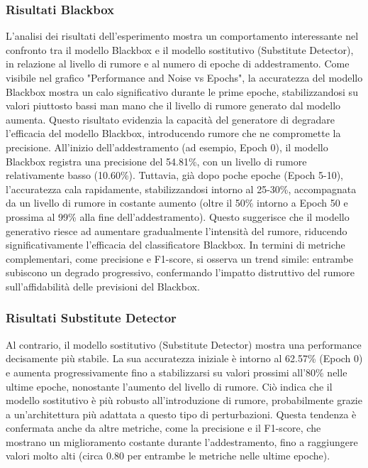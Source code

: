 \subsubsection{Risultati Blackbox}
L'analisi dei risultati dell'esperimento mostra un comportamento interessante nel confronto tra il modello Blackbox e il modello sostitutivo (Substitute Detector), in relazione al livello di rumore e al numero di epoche di addestramento.
Come visibile nel grafico "Performance and Noise vs Epochs", la accuratezza del modello Blackbox mostra un calo significativo durante le prime epoche, stabilizzandosi su valori piuttosto bassi man mano che il livello di rumore generato dal modello aumenta. Questo risultato evidenzia la capacità del generatore di degradare l'efficacia del modello Blackbox, introducendo rumore che ne compromette la precisione.
All'inizio dell'addestramento (ad esempio, Epoch 0), il modello Blackbox registra una precisione del 54.81\%, con un livello di rumore relativamente basso (10.60\%). Tuttavia, già dopo poche epoche (Epoch 5-10), l'accuratezza cala rapidamente, stabilizzandosi intorno al 25-30\%, accompagnata da un livello di rumore in costante aumento (oltre il 50\% intorno a Epoch 50 e prossima al 99\% alla fine dell'addestramento). Questo suggerisce che il modello generativo riesce ad aumentare gradualmente l'intensità del rumore, riducendo significativamente l'efficacia del classificatore Blackbox.
In termini di metriche complementari, come precisione e F1-score, si osserva un trend simile: entrambe subiscono un degrado progressivo, confermando l'impatto distruttivo del rumore sull'affidabilità delle previsioni del Blackbox.
\subsubsection{Risultati Substitute Detector}
Al contrario, il modello sostitutivo (Substitute Detector) mostra una performance decisamente più stabile. La sua accuratezza iniziale è intorno al 62.57\% (Epoch 0) e aumenta progressivamente fino a stabilizzarsi su valori prossimi all'80\% nelle ultime epoche, nonostante l'aumento del livello di rumore. Ciò indica che il modello sostitutivo è più robusto all'introduzione di rumore, probabilmente grazie a un'architettura più adattata a questo tipo di perturbazioni.
Questa tendenza è confermata anche da altre metriche, come la precisione e il F1-score, che mostrano un miglioramento costante durante l'addestramento, fino a raggiungere valori molto alti (circa 0.80 per entrambe le metriche nelle ultime epoche).
